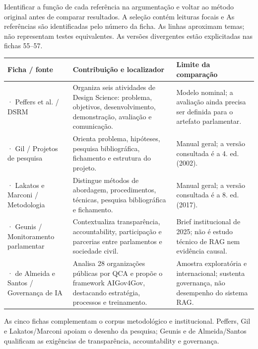 Identificar a função de cada referência na argumentação e voltar ao método original antes de comparar resultados. A seleção contém leituras focais e
\clearpage
{}
As referências são identificadas pelo número da ficha. As linhas aproximam temas; não representam testes equivalentes. As versões divergentes estão explicitadas nas fichas 55--57.

{\small\renewcommand{\arraystretch}{1.3}
\begin{tabularx}{\textwidth}{@{}>{\raggedright\arraybackslash}p{29mm}>{\raggedright\arraybackslash}X>{\raggedright\arraybackslash}X@{}}
\toprule
\textbf{Ficha / fonte} & \textbf{Contribuição e localizador} & \textbf{Limite da comparação}\\
\midrule
54 · Peffers et al. / DSRM & Organiza seis atividades de Design Science: problema, objetivos, desenvolvimento, demonstração, avaliação e comunicação. & Modelo nominal; a avaliação ainda precisa ser definida para o artefato parlamentar.\\[-2pt]
\addlinespace[5pt]
55 · Gil / Projetos de pesquisa & Orienta problema, hipóteses, pesquisa bibliográfica, fichamento e estrutura do projeto. & Manual geral; a versão consultada é a 4. ed. (2002).\\[-2pt]
\addlinespace[5pt]
56 · Lakatos e Marconi / Metodologia & Distingue métodos de abordagem, procedimentos, técnicas, pesquisa bibliográfica e fichamento. & Manual geral; a versão consultada é a 8. ed. (2017).\\[-2pt]
\addlinespace[5pt]
57 · Geunis / Monitoramento parlamentar & Contextualiza transparência, accountability, participação e parcerias entre parlamentos e sociedade civil. & Brief institucional de 2025; não é estudo técnico de RAG nem evidência causal.\\
\addlinespace[5pt]
58 · de Almeida e Santos / Governança de IA & Analisa 28 organizações públicas por QCA e propõe o framework AIGov4Gov, destacando estratégia, processos e treinamento. & Amostra exploratória e internacional; sustenta governança, não desempenho do sistema RAG.\\
\bottomrule
\end{tabularx}}

As cinco fichas complementam o corpus metodológico e institucional. Peffers, Gil e Lakatos/Marconi apoiam o desenho da pesquisa; Geunis e de Almeida/Santos qualificam as exigências de transparência, accountability e governança.
